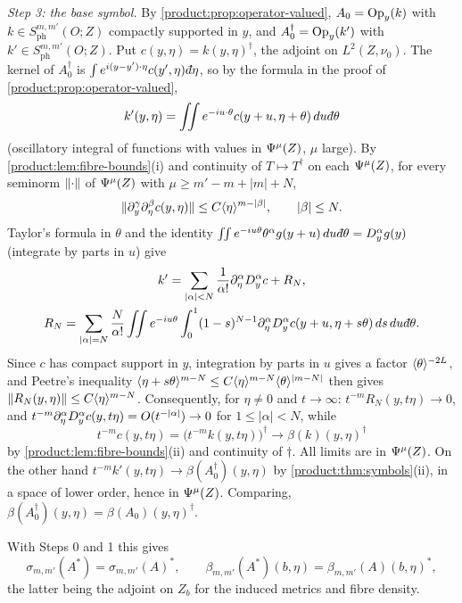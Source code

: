\emph{Step 3: the base symbol.} By \cref{product:prop:operator-valued},
$A_0=\operatorname{Op}_y(k)$ with $k\in S^{m,m'}_{\mathrm{ph}}(O;Z)$ compactly supported in $y$, and
$A_0^\dagger=\operatorname{Op}_y(k')$ with $k'\in S^{m,m'}_{\mathrm{ph}}(O;Z)$. Put
$c(y,\eta)=k(y,\eta)^\dagger$, the adjoint on $L^2(Z,\nu_0)$. The kernel of
$A_0^\dagger$ is $\int e^{i(y-y')\cdot\eta}c(y',\eta)\,\dbar\eta$, so by the formula in
the proof of \cref{product:prop:operator-valued},
\begin{equation*}
k'(y,\eta)=\iint e^{-iu\cdot\theta}c(y+u,\eta+\theta)\,du\,\dbar\theta
\end{equation*}
(oscillatory integral of functions with values in $\Psi^{\mu}(Z)$, $\mu$ large). By
\cref{product:lem:fibre-bounds}(i) and continuity of $T\mapsto T^\dagger$ on each
$\Psi^{\mu}(Z)$, for every seminorm $\lVert \cdot\rVert$ of $\Psi^{\mu}(Z)$ with
$\mu\ge m'-m+|m|+N$,
\begin{equation*}
\lVert \partial_y^\gamma\partial_\eta^\beta c(y,\eta)\rVert\le C\langle \eta\rangle^{m-|\beta|},\qquad|\beta|\le N .
\end{equation*}
Taylor's formula in $\theta$ and the identity $\iint e^{-iu\theta}\theta^\alpha
g(y+u)\,du\,\dbar\theta=D_y^\alpha g(y)$ (integrate by parts in $u$) give
\begin{gather*}
k'=\sum_{|\alpha|<N}\frac1{\alpha!}\pa_\eta^\alpha D_y^\alpha c+R_N,\\
R_N=\sum_{|\alpha|=N}\frac N{\alpha!}\iint e^{-iu\theta}\int_0^1(1-s)^{N-1}
\pa_\eta^\alpha D_y^\alpha c(y+u,\eta+s\theta)\,ds\,du\,\dbar\theta .
\end{gather*}
Since $c$ has compact support in $y$, integration by parts in $u$ gives a factor
$\langle \theta\rangle^{-2L}$, and Peetre's inequality $\langle \eta+s\theta\rangle^{m-N}\le
C\langle \eta\rangle^{m-N}\langle \theta\rangle^{|m-N|}$ then gives $\lVert R_N(y,\eta)\rVert\le C\langle \eta\rangle^{m-N}$.
Consequently, for $\eta\ne0$ and $t\to\infty$: $t^{-m}R_N(y,t\eta)\to0$, and
$t^{-m}\partial_\eta^\alpha D_y^\alpha c(y,t\eta)=O(t^{-|\alpha|})\to0$ for
$1\le|\alpha|<N$, while
\begin{equation*}
t^{-m}c(y,t\eta)=\big(t^{-m}k(y,t\eta)\big)^\dagger\to\beta(k)(y,\eta)^\dagger
\end{equation*}
by
\cref{product:lem:fibre-bounds}(ii) and continuity of $\dagger$. All limits are in
$\Psi^{\mu}(Z)$. On the other hand $t^{-m}k'(y,t\eta)\to\beta(A_0^\dagger)(y,\eta)$ by
\cref{product:thm:symbols}(ii), in a space of lower order, hence in $\Psi^{\mu}(Z)$.
Comparing, $\beta(A_0^\dagger)(y,\eta)=\beta(A_0)(y,\eta)^\dagger$.

With Steps 0 and 1 this gives
\begin{equation*}
\sigma_{m,m'}(A^*)=\sigma_{m,m'}(A)^*,\qquad
\beta_{m,m'}(A^*)(b,\eta)=\beta_{m,m'}(A)(b,\eta)^*,
\end{equation*}
the latter being the adjoint on $Z_b$ for the induced metrics and fibre density.

